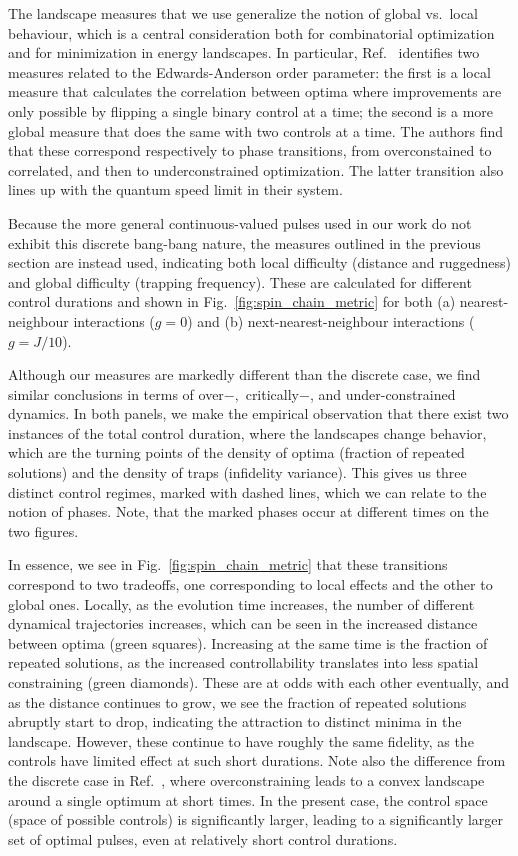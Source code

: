 \documentclass[aps, twocolumn,superscriptaddress]{revtex4-1}
\begin{document}
The landscape measures that we use generalize the notion of global vs.~local behaviour, which is a central consideration both for combinatorial optimization and for minimization in energy landscapes. In particular, Ref.~\cite{day2019glassy} identifies two measures related to the Edwards-Anderson order parameter: the first is a local measure that calculates the correlation between optima where improvements are only possible by flipping a single binary control at a time; the second is a more global measure that does the same with two controls at a time.  The authors find that these correspond respectively to phase transitions, from overconstained to correlated, and then to underconstrained optimization. The latter transition also lines up with the quantum speed limit in their system. 

 Because the more general continuous-valued pulses used in our work do not exhibit this discrete bang-bang nature, the measures outlined in the previous section are instead used, indicating both local difficulty (distance and ruggedness) and global difficulty (trapping frequency). These are calculated for different control durations and shown in Fig.~\ref{fig:spin_chain_metric} for both (a) nearest-neighbour interactions ($g=0$) and (b) next-nearest-neighbour interactions ($g = J/10$).

Although our measures are markedly different than the discrete case, we find similar conclusions in terms of over$-,$ critically$-$, and under-constrained dynamics. In both panels, we make the empirical observation that there exist two instances of the total control duration, where the landscapes change behavior, which are the turning points of the density of optima (fraction of repeated solutions) and the density of traps (infidelity variance). This gives us three distinct control regimes, marked with dashed lines, which we can relate to the notion of phases. Note, that the marked phases occur at different times on the two figures.

In essence, we see in Fig.~\ref{fig:spin_chain_metric} that these transitions correspond to two tradeoffs, one corresponding to local effects and the other to global ones. Locally, as the evolution time increases, the number of different dynamical trajectories increases, which can be seen in the increased distance between optima (green squares). Increasing at the same time is the fraction of repeated solutions, as the increased controllability translates into less spatial constraining (green diamonds). These are at odds with each other eventually, and as the distance continues to grow, we see the fraction of repeated solutions abruptly start to drop, indicating the attraction to distinct minima in the landscape. However, these continue to have roughly the same fidelity, as the controls have limited effect at such short durations.
Note also the difference from the discrete case in Ref.~\cite{bukov2018reinforcement}, where overconstraining leads to a convex landscape around a single optimum at short times.  In the present case, the control space (space of possible controls) is significantly larger, leading to a significantly larger set of optimal pulses, even at relatively short control durations.  
\end{document}
